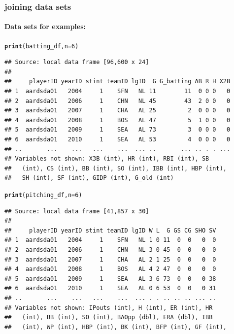 \documentclass{beamer}\usepackage[]{graphicx}\usepackage[]{color}
\makeatletter
\newcommand{\hlnum}[1]{\textcolor[rgb]{0.686,0.059,0.569}{#1}}%
\newcommand{\hlstd}[1]{\textcolor[rgb]{0.345,0.345,0.345}{#1}}%
\newcommand{\hlkwc}[1]{\textcolor[rgb]{0.333,0.667,0.333}{#1}}%
\newcommand{\hlkwd}[1]{\textcolor[rgb]{0.737,0.353,0.396}{\textbf{#1}}}%
\newenvironment{kframe}{%
 \def\at@end@of@kframe{}%
 \ifinner\ifhmode%
  \def\at@end@of@kframe{\end{minipage}}%
  \begin{minipage}{\columnwidth}%
 \fi\fi%
 \def\FrameCommand##1{\hskip\@totalleftmargin \hskip-\fboxsep
 \colorbox{shadecolor}{##1}\hskip-\fboxsep
     \hskip-\linewidth \hskip-\@totalleftmargin \hskip\columnwidth}%
 \MakeFramed {\advance\hsize-\width
   \@totalleftmargin\z@ \linewidth\hsize
   \@setminipage}}%
 {\par\unskip\endMakeFramed%
 \at@end@of@kframe}
\newenvironment{knitrout}{}{} %
\makeatother
\begin{document}
\begin{frame}
  \frametitle{joining data sets} 
  \framesubtitle{Data sets for examples:}
\begin{knitrout}\footnotesize
{}\color{fgcolor}\begin{kframe}
\begin{alltt}
\hlkwd{print}\hlstd{(batting_df,}  \hlkwc{n} \hlstd{=} \hlnum{6}\hlstd{)}
\end{alltt}
\begin{verbatim}
## Source: local data frame [96,600 x 24]
## 
##     playerID yearID stint teamID lgID  G G_batting AB R H X2B
## 1  aardsda01   2004     1    SFN   NL 11        11  0 0 0   0
## 2  aardsda01   2006     1    CHN   NL 45        43  2 0 0   0
## 3  aardsda01   2007     1    CHA   AL 25         2  0 0 0   0
## 4  aardsda01   2008     1    BOS   AL 47         5  1 0 0   0
## 5  aardsda01   2009     1    SEA   AL 73         3  0 0 0   0
## 6  aardsda01   2010     1    SEA   AL 53         4  0 0 0   0
## ..       ...    ...   ...    ...  ... ..       ... .. . . ...
## Variables not shown: X3B (int), HR (int), RBI (int), SB
##   (int), CS (int), BB (int), SO (int), IBB (int), HBP (int),
##   SH (int), SF (int), GIDP (int), G_old (int)
\end{verbatim}
\end{kframe}
\end{knitrout}
  \pagebreak
\begin{knitrout}\footnotesize
{}\color{fgcolor}\begin{kframe}
\begin{alltt}
\hlkwd{print}\hlstd{(pitching_df,} \hlkwc{n} \hlstd{=} \hlnum{6}\hlstd{)}
\end{alltt}
\begin{verbatim}
## Source: local data frame [41,857 x 30]
## 
##     playerID yearID stint teamID lgID W L  G GS CG SHO SV
## 1  aardsda01   2004     1    SFN   NL 1 0 11  0  0   0  0
## 2  aardsda01   2006     1    CHN   NL 3 0 45  0  0   0  0
## 3  aardsda01   2007     1    CHA   AL 2 1 25  0  0   0  0
## 4  aardsda01   2008     1    BOS   AL 4 2 47  0  0   0  0
## 5  aardsda01   2009     1    SEA   AL 3 6 73  0  0   0 38
## 6  aardsda01   2010     1    SEA   AL 0 6 53  0  0   0 31
## ..       ...    ...   ...    ...  ... . . .. .. .. ... ..
## Variables not shown: IPouts (int), H (int), ER (int), HR
##   (int), BB (int), SO (int), BAOpp (dbl), ERA (dbl), IBB
##   (int), WP (int), HBP (int), BK (int), BFP (int), GF (int),

\end{verbatim}
\end{kframe}
\end{knitrout}
\end{frame}
\end{document}
